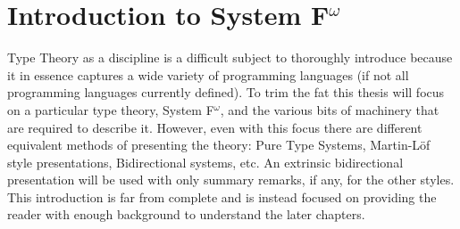 \chapter{Introduction to \texorpdfstring{System F$^\omega$}{System F Omega}}

Type Theory as a discipline is a difficult subject to thoroughly introduce because it in essence captures a wide variety of programming languages (if not all programming languages currently defined).
To trim the fat this thesis will focus on a particular type theory, System F$^\omega$, and the various bits of machinery that are required to describe it.
However, even with this focus there are different equivalent methods of presenting the theory: Pure Type Systems, Martin-L\"{o}f style presentations, Bidirectional systems, etc.
An extrinsic bidirectional presentation will be used with only summary remarks, if any, for the other styles.
This introduction is far from complete and is instead focused on providing the reader with enough background to understand the later chapters.


